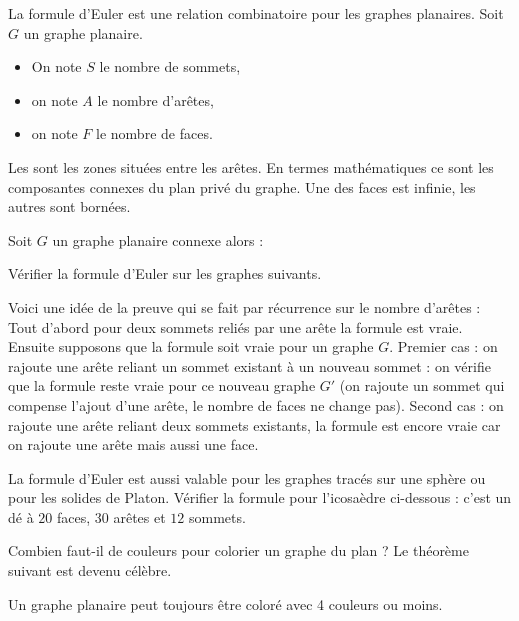 \documentclass[11pt,class=report,crop=false]{standalone}
\begin{document}
La formule d'Euler est une relation combinatoire pour les graphes planaires.
Soit $G$ un graphe planaire.
\begin{itemize}
	\item On note $S$ le nombre de sommets,
	\item on note $A$ le nombre d'arêtes,
	\item on note $F$ le nombre de faces.
\end{itemize}

Les  sont les zones situées entre les arêtes. En termes mathématiques ce sont les composantes connexes du plan privé du graphe. Une des faces est infinie, les autres sont bornées.




\begin{theoreme}
Soit $G$ un graphe planaire connexe alors :
\end{theoreme}

\begin{exercicecours}
Vérifier la formule d'Euler sur les graphes suivants.
\end{exercicecours}

Voici une idée de la preuve qui se fait par récurrence sur le nombre d'arêtes :
Tout d'abord pour deux sommets reliés par une arête la formule est vraie.
Ensuite supposons que la formule soit vraie pour un graphe $G$.
Premier cas : on rajoute une arête reliant un sommet existant à un nouveau sommet : on vérifie que la formule reste vraie pour ce nouveau graphe $G'$ (on rajoute un sommet qui compense l'ajout d'une arête, le nombre de faces ne change pas).
Second cas : on rajoute une arête reliant deux sommets existants, la formule est encore vraie car on rajoute une arête mais aussi une face.


La formule d'Euler est aussi valable pour les graphes tracés sur une sphère ou pour les solides de Platon.
Vérifier la formule pour l'icosaèdre ci-dessous : c'est un dé à $20$ faces, $30$ arêtes et $12$ sommets.


\bigskip

Combien faut-il de couleurs pour colorier un graphe du plan ? Le théorème suivant est devenu célèbre.

\begin{theoreme}
Un graphe planaire peut toujours être coloré avec 4 couleurs ou moins.
\end{theoreme}
\end{document}
